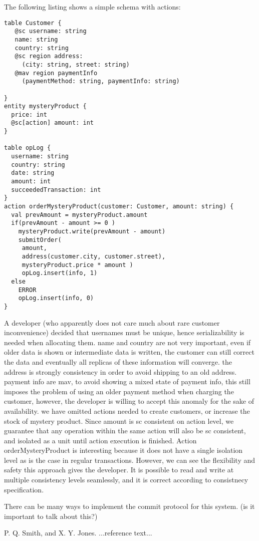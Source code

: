 \documentclass[preprint, numbers]{sigplanconf}
\begin{document}
The following listing shows a simple schema with actions:
\begin{lstlisting}[basicstyle=\small]
table Customer {
   @sc username: string
   name: string 
   country: string
   @sc region address: 
     (city: string, street: string)
   @mav region paymentInfo 
     (paymentMethod: string, paymentInfo: string)

}
entity mysteryProduct {
  price: int
  @sc[action] amount: int
}

table opLog {
  username: string
  country: string
  date: string
  amount: int
  succeededTransaction: int
}
action orderMysteryProduct(customer: Customer, amount: string) {
  val prevAmount = mysteryProduct.amount
  if(prevAmount - amount >= 0 )
    mysteryProduct.write(prevAmount - amount)
    submitOrder(
     amount, 
     address(customer.city, customer.street), 
     mysteryProduct.price * amount )
     opLog.insert(info, 1)
  else 
    ERROR
    opLog.insert(info, 0)
}
\end{lstlisting}

A developer (who apparently does not care much about rare customer inconvenience)
decided that usernames must be unique, hence serializability is needed
when allocating them. name and country are not very important, even if older
data is shown or intermediate data is written, the customer can still correct
the data and eventually all replicas of these information will converge. the
address is strongly consistency in order to avoid shipping to an old address.
payment info are mav, to avoid showing a mixed state of payment info, this still
imposes the problem of using an older payment method when charging the customer,
however, the developer is willing to accept this anomaly for the sake of
availability. 
we have omitted actions needed to create customers, or increase the stock of mystery
product. Since amount is sc consistent on action level, we guarantee that any
operation within the same action will
also be sc consistent, and isolated as a unit until action execution is finished. 
Action orderMysteryProduct is interesting because it does
not have a single isolation level as is the case in regular transactions.
However, we can see the flexibility and safety this approach gives the
developer. It is possible to read and write at multiple consistency levels
seamlessly, and it is correct according to consistnecy specification.

There can be many ways to implement the commit protocol for this system. (is it important to talk about this?)

\appendix







\begin{thebibliography}{}
\softraggedright

P. Q. Smith, and X. Y. Jones. ...reference text...

\end{thebibliography}
\end{document}
